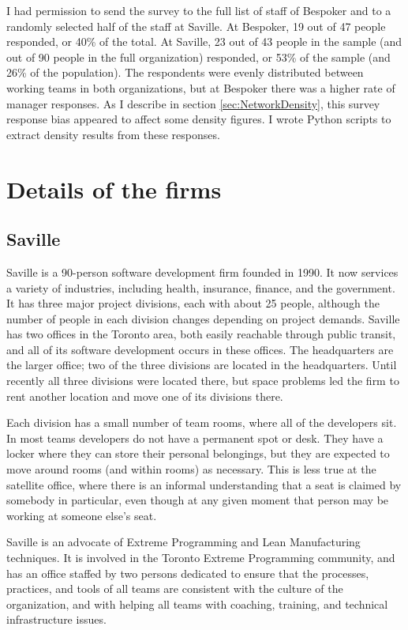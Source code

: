 I had permission to send the survey to the full list of staff of Bespoker and to a randomly selected half of the staff at Saville. At Bespoker, 19 out of 47 people responded, or 40\% of the total. At Saville, 23 out of 43 people in the sample (and out of 90 people in the full organization) responded, or 53\% of the sample (and 26\% of the population). The respondents were evenly distributed between working teams in both organizations, but at Bespoker there was a higher rate of manager responses. As I describe in section \ref{sec:NetworkDensity}, this survey response bias appeared to affect some density figures. I wrote Python scripts to extract density results from these responses.



\section{Details of the firms}

\subsection{Saville}

Saville is a 90-person software development firm founded in 1990. It now services a variety of industries, including health, insurance, finance, and the government. It has three major project divisions, each with about 25 people, although the number of people in each division changes depending on project demands. Saville has two offices in the Toronto area, both easily reachable through public transit, and all of its software development occurs in these offices. The headquarters are the larger office; two of the three divisions are located in the headquarters. Until recently all three divisions were located there, but space problems led the firm to rent another location and move one of its divisions there.

Each division has a small number of team rooms, where all of the developers sit. In most teams developers do not have a permanent spot or desk. They have a locker where they can store their personal belongings, but they are expected to move around rooms (and within rooms) as necessary. This is less true at the satellite office, where there is an informal understanding that a seat is claimed by somebody in particular, even though at any given moment that person may be working at someone else's seat.

Saville is an advocate of Extreme Programming and Lean Manufacturing techniques. It is involved in the Toronto Extreme Programming community, and has an office staffed by two persons dedicated to ensure that the processes, practices, and tools of all teams are consistent with the culture of the organization, and with helping all teams with coaching, training, and technical infrastructure issues.

